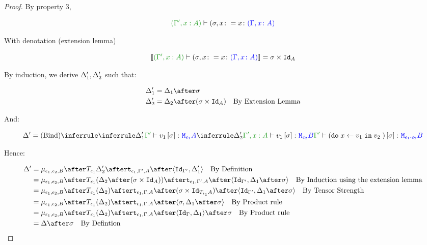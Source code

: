 \documentclass{report}
\begin{document}
\begin{framed}
\begin{proof}
        By property 3,
        
        \begin{equation}
            \typerelation{(\G', x:A)}{(\si, x\setto x}{(\gax)}
        \end{equation}
        
        With denotation (extension lemma)
        
        \begin{equation}
            \deno{\typerelation{(\G', x:A)}{(\si, x\setto x}{(\gax)}} = \si\times\Id{A}
        \end{equation}
        
        By induction, we derive $\Delta_1', \Delta_2'$ such that:
        
        \begin{align*}
            \D_1' & = \D_1\after \si\\
            \D_2' & = \D_2\after (\si\times\Id{A})\qt{By Extension Lemma}
        \end{align*}
        
        And:
        
        \begin{equation}
            \D' = \ntreeruleII{Bind}{
                \treeruleI{\D_1'}{\typerelation{\G'}{v_1\ssi}{\M{\e_1}{A}}}
                }{
                \treeruleI{\D_2'}{\typerelation{\G', x:A }{v_1\ssi}{\M{\e_2}{B}}}
            }{
                \typerelation{\G'}{(\doin{x}{v_1}{v_2})\ssi}{\M{\e_1\dot\e_2}{B}}
            }
        \end{equation}
        
        Hence:
        
        \begin{align*}
            \D' & = \bind{\e_1}{\e_2}{B}\after\T{\e_1}{\D_2'}\after\tstrength{\e_1}{\G'}{A}\after\pr{\Id{\G'}}{\D_1'}\qt{By Definition}\\
            & = \bind{\e_1}{\e_2}{B}\after\T{\e_1}{(\D_2\after(\si\times\Id{A}))}\after\tstrength{\e_1}{\G'}{A}\after\pr{\Id{\G'}}{\D_1\after\si}\qt{By Induction using the extension lemma}\\
            & = \bind{\e_1}{\e_2}{B}\after\T{\e_1}{(\D_2)}\after\tstrength{\e_1}{\G}{A}\after(\si\times\Id{\T{\e_1}{A}})\after\pr{\Id{\G'}}{\D_1\after\si}\qt{By Tensor Strength}\\
            & = \bind{\e_1}{\e_2}{B}\after\T{\e_1}{(\D_2)}\after\tstrength{\e_1}{\G}{A}\after\pr{\si}{\D_1\after\si}\qt{By Product rule}\\
            & = \bind{\e_1}{\e_2}{B}\after\T{\e_1}{(\D_2)}\after\tstrength{\e_1}{\G}{A}\after\pr{\idg}{\D_1}\after\si\qt{By Product rule}\\
            &= \D\after\si\qt{By Defintion}\\
        \end{align*}
        
        
    \end{proof}
\end{framed}
\end{document}

